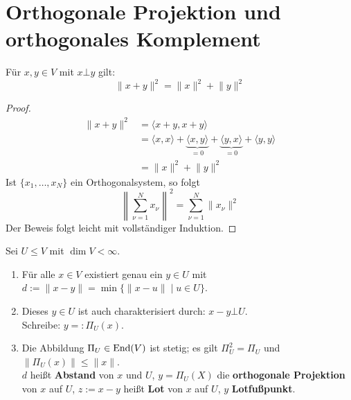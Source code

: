 \documentclass[parskip,a4paper,twoside,DIV15,BCOR12mm]{scrbook}
\begin{document}
\section{Orthogonale Projektion und orthogonales Komplement}
\begin{theo}
\label{Satz 17.3}
Für \(x,y\in V\) mit \(x\bot y\) gilt:
\[
\lVert x+y\rVert^{2}=\lVert x\rVert^{2}+\lVert y\rVert^{2}
\]
\end{theo}
\begin{proof}
\begin{align*}
\lVert x+y\rVert^{2}&=\langle x+y,x+y\rangle\\
&=\langle x,x\rangle+\underbrace{\langle x,y\rangle}_{=0}+
    \underbrace{\langle y,x\rangle}_{=0}+\langle y,y\rangle\\
&=\lVert x\rVert^{2}+\lVert y\rVert^{2}
\end{align*}
Ist \(\{x_{1},\ldots,x_{N}\}\) ein Orthogonalsystem, so folgt
\[
\left\lVert\sum_{\nu=1}^{N}{x_{\nu}}\right\rVert^{2}=\sum_{\nu=1}^{N}\lVert x_{\nu}\rVert^{2}
\]
Der Beweis folgt leicht mit vollständiger Induktion.
\end{proof}
\begin{theo}
\label{Satz 17.4}
Sei \(U\leq V\) mit \(\dim V<\infty\).
\begin{enumerate}
\item Für alle \(x\in V\) existiert genau ein \(y\in U\) mit 
\(d:=\lVert x-y\rVert=\min\{\lVert x-u\rVert\mid u\in U\}\).
\item Dieses \(y\in U\) ist auch charakterisiert durch: \(x-y\bot U\).\\
Schreibe: \(y=:\Pi_{U}(x)\).
\item Die Abbildung \(\Pi_{U}\in\operatorname{End}(V)\) ist stetig; es gilt 
\(\Pi_{U}^{2}=\Pi_{U}\) und \(\lVert\Pi_{U}(x)\rVert\leq\lVert x\rVert\).\\
\(d\) heißt \textbf{Abstand} von \(x\) und \(U\), \(y=\Pi_{U}(X)\) die
\textbf{orthogonale Projektion} von \(x\) auf \(U\), \(z:=x-y\) heißt 
\textbf{Lot} von \(x\) auf \(U\), \(y\) \textbf{Lotfußpunkt}.
\end{enumerate}
\end{theo}
\end{document}
